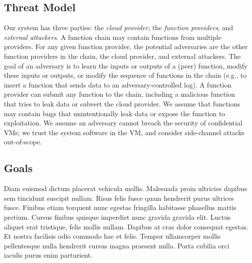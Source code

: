 \subsection{Threat Model}
\label{sec:threat-model}

Our system has three parties: the \emph{cloud provider}, the \emph{function
providers}, and \emph{external attackers}.
%
A function chain may contain functions from multiple providers.
%
For any given function provider, the potential adversaries
are the other function providers in the chain, the cloud provider, and
external attackers.
%
The goal of an adversary is to learn the inputs or outputs of a (peer)
function, modify these inputs or outputs, or modify the sequence of functions
in the chain (e.g., to insert a function that sends data to an
adversary-controlled log).
%
A function provider can submit any function to the chain, including a
malicious function that tries to leak data or subvert the cloud
provider.
%
We assume that functions may contain bugs that unintentionally leak
data or expose the function to exploitation.
%
We assume an adversary cannot breach the security of confidential VMs; we trust
the system software in the VM, and consider side-channel attacks out-of-scope.
%


\subsection{Goals}
\label{sec:goals}

\color{red}
Diam euismod dictum placerat vehicula mollis. Malesuada proin ultricies dapibus
sem tincidunt suscipit nullam. Risus felis fusce quam hendrerit purus ultrices
fusce. Finibus etiam torquent nunc egestas fringilla habitasse phasellus mattis
pretium. Cursus finibus quisque imperdiet nunc gravida gravida elit. Luctus
aliquet erat tristique, felis mollis nullam. Dapibus at cras dolor consequat
egestas. Et nostra facilisis odio commodo hac et felis. Tempor ullamcorper
mollis pellentesque nulla hendrerit cursus magna praesent nulla. Porta cubilia
orci iaculis purus enim parturient.
\color{black}
